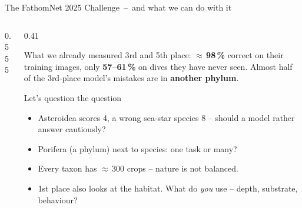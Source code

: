 \begin{frame}{The FathomNet 2025 Challenge \,--\, and what we can do with it}
\begin{columns}[T]
\begin{column}{0.555\linewidth}
{\begin{tabular}{@{}llr@{}}
    \bottomrule
  \end{tabular}}
\end{column}
\begin{column}{0.41\linewidth}
  \begin{infobox}{What we already measured}
    \fsmall
    3rd and 5th place: \textbf{$\approx$\,98\,\%} correct on their training images, only
    \textbf{\textcolor{accentred}{57--61\,\%}} on dives they have never seen. Almost half of the
    3rd-place model's mistakes are in \textbf{another phylum}.
  \end{infobox}
  \vspace{1pt}
  \begin{ideabox}{Let's question the question}
    \fsmall
    \begin{itemize}\setlength{\itemsep}{1pt}
      \item Asteroidea scores 4, a wrong sea-star species 8 -- should a model rather answer cautiously?
      \item Porifera (a phylum) next to species: one task or many?
      \item Every taxon has $\approx$\,300 crops -- nature is not balanced.
      \item 1st place also looks at the habitat. What do \emph{you} use -- depth, substrate, behaviour?
    \end{itemize}
  \end{ideabox}
\end{column}
\end{columns}
\end{frame}
